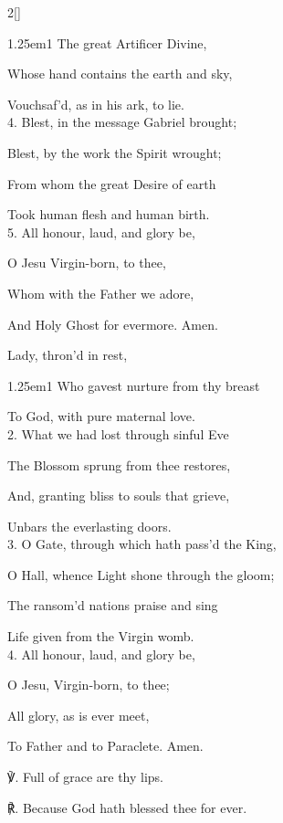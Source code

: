 \begin{paracol}{2}[]
\begin{hangparas}{1.25em}{1}
The great Artificer Divine,

Whose hand contains the earth and sky,

Vouchsaf'd, as in his ark, to lie.\\

4. Blest, in the message Gabriel brought;

Blest, by the work the Spirit wrought;

From whom the great Desire of earth

Took human flesh and human birth.\\

5. All honour, laud, and glory be,

O Jesu Virgin-born, to thee,

Whom with the Father we adore,

And Holy Ghost for evermore. Amen.
\end{hangparas}

\newpage
\mattinsOfficeHymn\label{BVMMattins}

 Lady, thron'd in rest,


\begin{hangparas}{1.25em}{1}
Who gavest nurture from thy breast

To God, with pure maternal love.\\

2. What we had lost through sinful Eve

The Blossom sprung from thee restores,

And, granting bliss to souls that grieve,

Unbars the everlasting doors.\\

3. O Gate, through which hath pass'd the King,

O Hall, whence Light shone through the gloom;

The ransom'd nations praise and sing

Life given from the Virgin womb.\\

4. All honour, laud, and glory be,

O Jesu, Virgin-born, to thee;

All glory, as is ever meet,

To Father and to Paraclete. Amen.\\
\end{hangparas}

℣. Full of grace are thy lips.

℟. Because God hath blessed thee for ever.


\fussy
\end{paracol}

